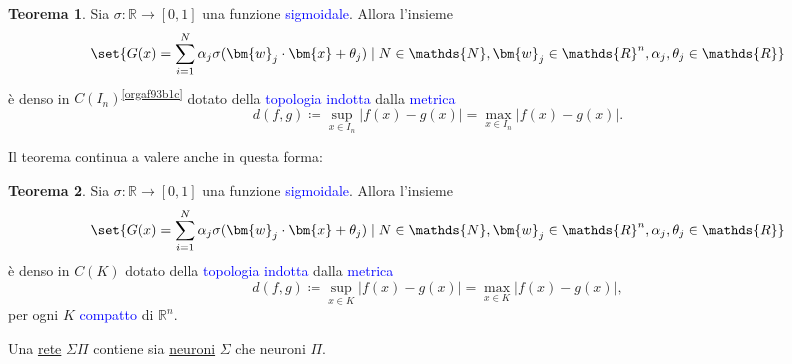 \documentclass[10pt]{book}
\newcommand{\1}{\mathds{1}}
\newcommand{\R}{\mathds{R}}
\newcommand{\N}{\mathds{N}}
\theoremstyle{definition}%
\newtheorem{thm}{Teorema}[section]
\theoremstyle{plain}
\theoremstyle{remark}
\renewcommand{\href}[2]{\textcolor{blue}{#2}}
\begin{document}
\begin{thm}
Sia \(\sigma:\R\to [0,1]\) una funzione \href{../../../../../org/roam/20250625110110-funzione_sigmoidale.org}{sigmoidale}. Allora l'insieme
\begin{equation*}
\set{G(x) = \sum_{i =1}^{N}\alpha_{j}\sigma(\bm{w}_{j}\cdot \bm{x} + \theta_{j})\mid N \in \N, \bm{w}_{j} \in \R^{n}, \alpha_{j}, \theta_{j} \in \R}
\end{equation*}
è denso in \(C(I_{n})\)\textsuperscript{\ref{orgaf93b1c}} dotato della \href{../../../../../org/roam/20250103145124-topologia.org}{topologia} \href{../../../../../org/roam/20250301193530-topologia_indotta_da_una_distanza.org}{indotta} dalla \href{../../../../../org/roam/20250301193511-spazio_metrico.org}{metrica}
\begin{equation*}
d(f,g) \coloneqq \sup_{x \in I_{n}} |f(x)-g(x)| = \max_{x \in I_{n}}|f(x)-g(x)|.
\end{equation*}
\label{teo9.3.6}
\end{thm}

Il teorema continua a valere anche in questa forma:
\begin{thm}
Sia \(\sigma:\R\to [0,1]\) una funzione \href{../../../../../org/roam/20250625110110-funzione_sigmoidale.org}{sigmoidale}. Allora l'insieme
\begin{equation*}
\set{G(x) = \sum_{i =1}^{N}\alpha_{j}\sigma(\bm{w}_{j}\cdot \bm{x} + \theta_{j})\mid N \in \N, \bm{w}_{j} \in \R^{n}, \alpha_{j}, \theta_{j} \in \R}
\end{equation*}
è denso in \(C(K)\) dotato della \href{../../../../../org/roam/20250103145124-topologia.org}{topologia} \href{../../../../../org/roam/20250301193530-topologia_indotta_da_una_distanza.org}{indotta} dalla \href{../../../../../org/roam/20250301193511-spazio_metrico.org}{metrica}
\begin{equation*}
d(f,g) \coloneqq \sup_{x \in K} |f(x)-g(x)| = \max_{x \in K}|f(x)-g(x)|,
\end{equation*}
per ogni \(K\) \href{../../../../../org/roam/20250103163701-spazio_topologico_compatto.org}{compatto} di \(\R^{n}\).
\end{thm}
Una \hyperref[sec:orgbb3f8c2]{rete} \(\Sigma\Pi\) contiene sia \hyperref[sec:org779563c]{neuroni} \(\Sigma\) che neuroni \(\Pi\).
\end{document}
